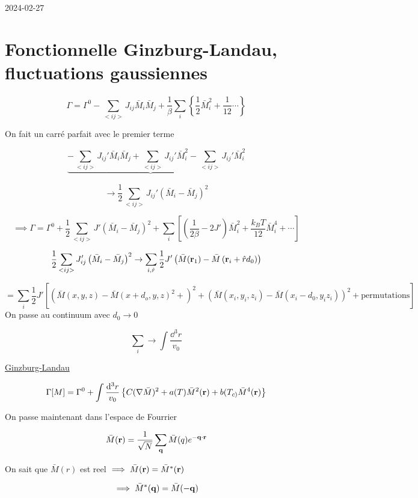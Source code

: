 


2024-02-27

\section*{Fonctionnelle Ginzburg-Landau, fluctuations gaussiennes }

\[ \Gamma = \Gamma^{0} - \sum_{<ij>} J_{ij} \bar M_i \bar{M}_j + \frac{1}{\beta} \sum_i \left\{ \frac{1}{2} \bar{M}_i^{2}+ \frac{1}{12} \dotsb \right\}  \]

On fait un carré parfait avec le premier terme

\[ \underbrace{-\sum_{<ij>} J_{ij}' \bar{M}_i \bar{M}_j + \sum_{<ij>} J_{ij}' \bar{M}_i^{2} - \sum_{<ij>} J_{ij}'}_{}  \bar{M}_i^2  \]


\[ \to \frac{1}{2} \sum_{<ij>} J_{ij}' \left( \bar{M}_i -\bar{M}_j \right)^{2}  \]


\[ \implies \Gamma = \Gamma^{0}+ \frac{1}{2} \sum_{<ij>} J' (\bar{M}_i -\bar{M}_j)^2  + \sum_i \left[ \left( \frac{1}{2\beta} - 2 J' \right) \bar{M}_i^{2} + \frac{k_{B}T}{12} \bar{M}_i^{4}+ \dotsb \right]  \]



\[ 	\frac{1}{2} \sum_{<ij>} J_{ij}' \left( \bar{M}_i -\bar{M}_j \right)^{2} \to \sum_{i,\hat{r}} \frac{1}{2} J' \left( \bar{M}(\vb{r}_1) - \bar{M} \left( \vb{r}_i + \hat r d_0  \right)  \right)  \]

\[ = \sum_i \frac{1}{2} J' \left[ \left(  \bar{M}(x,y,z) - \bar{M}(x+d_o ,y ,z)^{2}+ \right)^{2}+ \left( \bar{M}(x_i , y_i , z_i ) - \bar{M}(x_i - d_0 ,y_i z_i ) \right)^{2} + \text{permutations}  \right]  \]
On passe au continuum avec \(d_0 \to 0\)


\[ \sum_i \to \int \frac{\dd^3{}r}{v_0}  \]


\underline{Ginzburg-Landau} 

\[ \Gamma[M] = \Gamma^{0} + \int \frac{\dd^{3}r}{v_0} \left\{ C (\nabla \bar{M})^{2} + a(T) \bar{M}^2 (\vb{r}) + b(T_{c)} \bar{M}^4 (\vb{r}) \right\}  \]

On passe maintenant dans l'espace de Fourrier

\[ \bar M (\vb{r}) = \frac{1}{\sqrt{N}} \sum_{\vb{q}} \bar{M}(q) e^{-\vb{q} \cdot  \vb{r}} \]

On sait que \(\bar{M}(r)\) est reel \(\implies \bar{M}(\vb{r}) = \bar{M}^{*}(\vb{r})\) 


\[ \implies \bar{M}^{*}(\vb{q}) = \bar{M}(-\vb{q}) \]




